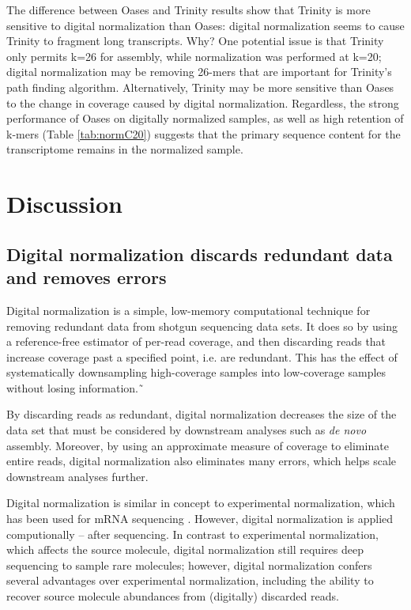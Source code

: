 \documentclass[10pt]{article}
\begin{document}

The difference between Oases and Trinity results show that Trinity is
more sensitive to digital normalization than Oases: digital
normalization seems to cause Trinity to fragment long transcripts.
Why?  One potential issue is that Trinity only permits k=26 for
assembly, while normalization was performed at k=20; digital
normalization may be removing 26-mers that are important for Trinity's
path finding algorithm.  Alternatively, Trinity may be more sensitive
than Oases to the change in coverage caused by digital normalization.
Regardless, the strong performance of Oases on digitally normalized
samples, as well as high retention of k-mers (Table \ref{tab:normC20})
suggests that the primary sequence content for the transcriptome remains
in the normalized sample.

\section*{Discussion}

\subsection*{Digital normalization discards redundant data and removes errors}

Digital normalization is a simple, low-memory computational technique
for removing redundant data from shotgun sequencing data sets.  It
does so by using a reference-free estimator of per-read coverage, and
then discarding reads that increase coverage past a specified point,
i.e. are redundant.  This has the effect of systematically
downsampling high-coverage samples into low-coverage samples without
losing information.˜

By discarding reads as redundant, digital normalization decreases the
size of the data set that must be considered by downstream analyses
such as {\em de novo} assembly.  Moreover, by using an approximate
measure of coverage to eliminate entire reads, digital normalization
also eliminates many errors, which helps scale downstream analyses
further.

Digital normalization is similar in concept to experimental
normalization, which has been used for mRNA sequencing
\cite{pubmed8889548,pubmed7937745}. However, digital normalization is
applied computionally -- after sequencing.  In contrast to
experimental normalization, which affects the source molecule, digital
normalization still requires deep sequencing to sample rare molecules;
however, digital normalization confers several advantages over
experimental normalization, including the ability to recover source
molecule abundances from (digitally) discarded reads.
\end{document}
